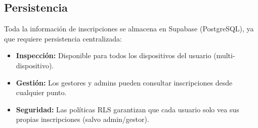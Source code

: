 \subsection{Persistencia}

Toda la informaci\'on de inscripciones se almacena en Supabase
(PostgreSQL), ya que requiere persistencia centralizada:
\begin{itemize}
  \item \textbf{Inspecci\'on:} Disponible para todos los dispositivos
    del usuario (multi-dispositivo).
  \item \textbf{Gesti\'on:} Los gestores y admins pueden consultar
    inscripciones desde cualquier punto.
  \item \textbf{Seguridad:} Las pol\'iticas RLS garantizan que cada
    usuario solo vea sus propias inscripciones (salvo admin/gestor).
\end{itemize}

